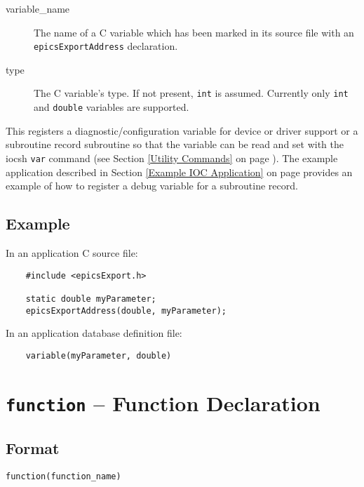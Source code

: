 \begin{description}
\item [variable\_name] The name of a C variable which has been marked in its source file with an 
\verb|epicsExportAddress| declaration.

\item [type] The C variable's type.
If not present, \verb|int| is assumed.
Currently only \verb|int| and \verb|double| variables are supported.
\end{description}

This registers a diagnostic/configuration variable for device or driver support or a subroutine record subroutine so that
the variable can be read and set with the iocsh \verb|var| command (see Section \ref{Utility Commands} on page \pageref{Utility Commands}).
The example application described in Section \ref{Example IOC Application} on page \pageref{Example IOC Application}
provides an example of how to register a debug variable for a subroutine record.

\subsection{Example}

In an application C source file:

\begin{verbatim}
    #include <epicsExport.h>

    static double myParameter;
    epicsExportAddress(double, myParameter);
\end{verbatim}

In an application database definition file:

\begin{verbatim}
    variable(myParameter, double)
\end{verbatim}

\section{\texttt{function} -- Function Declaration}

\subsection{Format}

\begin{verbatim}
function(function_name)
\end{verbatim}


